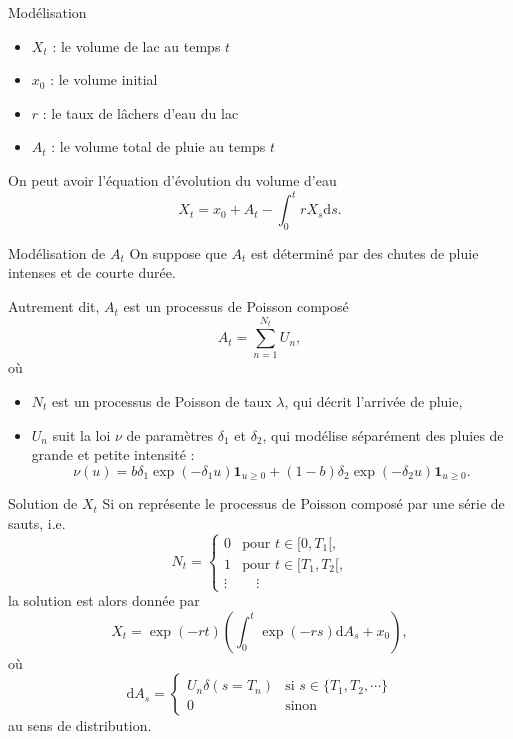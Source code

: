 \documentclass{beamer}
\def \dd {\mathrm{d}}
\begin{document}
\begin{frame}{Modélisation}
\begin{itemize}
    \item $X_t$ : le volume de lac au temps $t$
    \item $x_0$ : le volume initial
    \item $r$ : le taux de lâchers d'eau du lac
    \item $A_t$ : le volume total de pluie au temps $t$
\end{itemize}
\pause

On peut avoir l'équation d'évolution du volume d'eau
\[X_t = x_0 + A_t - \int_0^t rX_s  \dd s.\]
    
\end{frame}

\begin{frame}{Modélisation de $A_t$}
    On suppose que $A_t$ est déterminé par des chutes de pluie intenses
et de courte durée.\pause 

Autrement dit, $A_t$ est un processus de Poisson composé
\[A_t = \sum_{n=1}^{N_t} U_n,\]\pause
où 
\begin{itemize}
    \item $N_t$ est un processus de Poisson de taux $\lambda$, qui décrit l'arrivée de pluie,
    \item $U_n$ suit la loi $\nu$ de paramètres $\delta_1$ et $\delta_2$, qui modélise séparément des pluies de grande et petite intensité :
\[\nu(u) = b\delta_1\exp(-\delta_1 u)\mathbf{1}_{u\geq 0} + (1-b)\delta_2\exp(-\delta_2 u)\mathbf{1}_{u\geq 0}.\]
\end{itemize}
\end{frame}

\begin{frame}{Solution de $X_t$}
    Si on représente le processus de Poisson composé par une série de sauts, i.e.
\[N_t = \begin{cases}0&\text{pour $t\in [0, T_1[$,}\\
  1&\text{pour $t\in [T_1, T_2[$,}\\
  \vdots &\quad\vdots\end{cases}\]\pause
la solution est alors donnée par
\[X_t = \exp(-r t)\left(\int_0^t \exp(-r s)\dd A_s + x_0\right),\]
où \[\dd A_s=\begin{cases} U_n\delta (s=T_n) &\text{si } s\in \{T_1,T_2,\cdots\}\\
  0&\text{sinon}\end{cases}\] 
au sens de distribution.
\end{frame}
\end{document}
